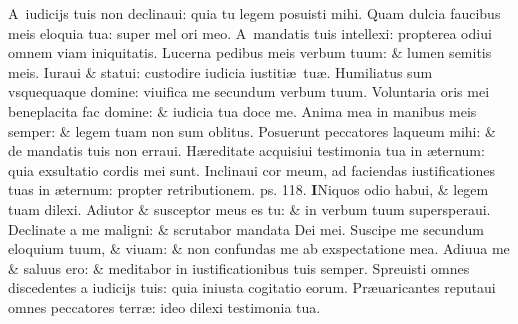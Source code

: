 \documentclass[a5paper,10pt]{book}
\def\ae{æ}
\begin{document}
\begin{multicols*}{2}
\newline \color{red} A\color{black}\ iudicijs tuis non declinaui: quia tu legem posuisti mihi.
\newline \color{red} Q\color{black}uam dulcia faucibus meis eloquia tua: super mel ori meo.
\newline \color{red} A\color{black}\ mandatis tuis intellexi: propterea odiui omnem viam iniquitatis.
\newline \color{red} L\color{black}ucerna pedibus meis verbum tuum: \& lumen semitis meis.
\newline \color{red} I\color{black}uraui \& statui: custodire iudicia iustiti\ae \ tu\ae .
\newline \color{red} H\color{black}umiliatus sum vsquequaque domine: viuifica me secundum verbum tuum.
\newline \color{red} V\color{black}oluntaria oris mei beneplacita fac domine: \& iudicia tua doce me.
\newline \color{red} A\color{black}nima mea in manibus meis semper: \& legem tuam non sum oblitus.
\newline \color{red} P\color{black}osuerunt peccatores laqueum mihi: \& de mandatis tuis non erraui.
\newline \color{red} H\color{black}\ae reditate acquisiui testimonia tua in \ae ternum: quia exsultatio cordis mei sunt.
\newline \color{red} I\color{black}nclinaui cor meum, ad faciendas iustificationes tuas in \ae ternum: propter retributionem. \quad \color{red} ps. 118. \color{black}
\lettrine[lines=2]{\bfseries \color{red} I}{}Niquos odio habui, \& legem tuam dilexi.
\newline \color{red} A\color{black}diutor \& susceptor meus es tu: \& in verbum tuum supersperaui.
\newline \color{red} D\color{black}eclinate a me maligni: \& scrutabor mandata Dei mei.
\newline \color{red} S\color{black}uscipe me secundum eloquium  tuum, \& viuam: \& non confundas me ab exspectatione mea.
\newline \color{red} A\color{black}diuua me \& saluus ero: \& meditabor in iustificationibus tuis semper.
\newline \color{red} S\color{black}preuisti omnes discedentes a iudicijs tuis: quia iniusta cogitatio eorum.
\newline \color{red} P\color{black}r\ae uaricantes reputaui omnes peccatores terr\ae : ideo dilexi testimonia tua.

\end{multicols*}
\end{document}
